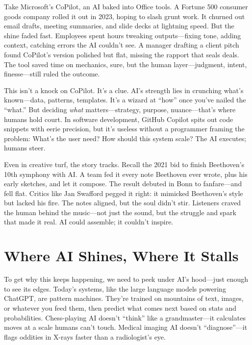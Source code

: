 \documentclass[
  Letterpaper,
]{scrbook}
\begin{document}
Take Microsoft's CoPilot, an AI baked into Office tools. A Fortune 500
consumer goods company rolled it out in 2023, hoping to slash grunt
work. It churned out email drafts, meeting summaries, and slide decks at
lightning speed. But the shine faded fast. Employees spent hours
tweaking outputs---fixing tone, adding context, catching errors the AI
couldn't see. A manager drafting a client pitch found CoPilot's version
polished but flat, missing the rapport that seals deals. The tool saved
time on mechanics, sure, but the human layer---judgment, intent,
finesse---still ruled the outcome.

This isn't a knock on CoPilot. It's a clue. AI's strength lies in
crunching what's known---data, patterns, templates. It's a wizard at
``how'' once you've nailed the ``what.'' But deciding \emph{what}
matters---strategy, purpose, nuance---that's where humans hold court. In
software development, GitHub Copilot spits out code snippets with eerie
precision, but it's useless without a programmer framing the problem:
What's the user need? How should this system scale? The AI executes;
humans steer.

Even in creative turf, the story tracks. Recall the 2021 bid to finish
Beethoven's 10th symphony with AI. A team fed it every note Beethoven
ever wrote, plus his early sketches, and let it compose. The result
debuted in Bonn to fanfare---and fell flat. Critics like Jan Swafford
pegged it right: it mimicked Beethoven's style but lacked his fire. The
notes aligned, but the soul didn't stir. Listeners craved the human
behind the music---not just the sound, but the struggle and spark that
made it real. AI could assemble; it couldn't inspire.

\section{Where AI Shines, Where It
Stalls}\label{where-ai-shines-where-it-stalls}

To get why this keeps happening, we need to peek under AI's hood---just
enough to see its edges. Today's systems, like the large language models
powering ChatGPT, are pattern machines. They're trained on mountains of
text, images, or whatever you feed them, then predict what comes next
based on stats and probabilities. Chess-playing AI doesn't ``think''
like a grandmaster---it calculates moves at a scale humans can't touch.
Medical imaging AI doesn't ``diagnose''---it flags oddities in X-rays
faster than a radiologist's eye.
\end{document}
